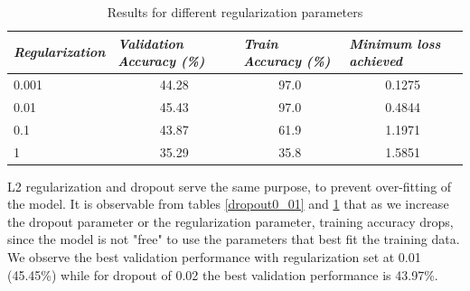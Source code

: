 \documentclass[12pt,twoside]{article}
\begin{document}
\begin{table}[!htbp]
\centering
\begin{tabular}{|l|c|c|c|}
\hline
\textit{\textbf{Regularization}} & \multicolumn{1}{l|}{\textit{\textbf{Validation Accuracy (\%)}}} & \multicolumn{1}{l|}{\textit{\textbf{Train Accuracy (\%)}}} & \multicolumn{1}{l|}{\textit{\textbf{Minimum loss achieved}}} \\ \hline
0.001                            & 44.28                                                           & 97.0                                                       & 0.1275                                                       \\ \hline
0.01                             & 45.43                                                           & 97.0                                                       & 0.4844                                                       \\ \hline
0.1                              & 43.87                                                           & 61.9                                                       & 1.1971                                                       \\ \hline
1                                & 35.29                                                           & 35.8                                                       & 1.5851                                                       \\ \hline
\end{tabular}
\caption{Results for different regularization parameters}
\label{regularization}
\end{table}

L2 regularization and dropout serve the same purpose, to prevent over-fitting of the model. It is observable from tables \ref{dropout0_01} and \ref{regularization} that as we increase the dropout parameter or the regularization parameter, training accuracy drops, since the model is not "free" to use the parameters that best fit the training data. We observe the best validation performance with regularization set at 0.01 (45.45\%) while for dropout of 0.02 the best validation performance is 43.97\%. 
\end{document}
